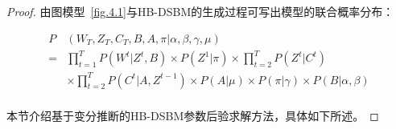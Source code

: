 \begin{proof}
	\label{HB-DSBM:inference}
	由图模型~\ref{fig.4.1}与HB-DSBM的生成过程可写出模型的联合概率分布：
	
	\begin{equation}
		\begin{split}
			P&(W_T, Z_T, C_T, B, A, \pi | \alpha, \beta, \gamma, \mu) \\
			= & \prod_{t=1}^T P(W^t | Z^t, B) \times  P(Z^1 | \pi) \times \prod_{t=2}^T P(Z^t | C^t) \\
			& \times \prod_{t=2}^T P(C^t | A, Z^{t-1}) \times P(A | \mu) \times P(\pi | \gamma) \times P(B | \alpha, \beta) \\
		\end{split}
	\end{equation}
	
	
	
	
	
	
	本节介绍基于变分推断的HB-DSBM参数后验求解方法，具体如下所述。
	

\end{proof}
